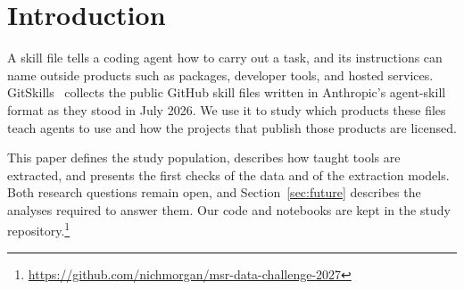 \section{Introduction}

A skill file tells a coding agent how to carry out a task, and its instructions can name outside products such as packages, developer tools, and hosted services.
GitSkills~\cite{gitskills2027} collects the public GitHub skill files written in Anthropic's agent-skill format as they stood in July 2026.
We use it to study which products these files teach agents to use and how the projects that publish those products are licensed.

This paper defines the study population, describes how taught tools are extracted, and presents the first checks of the data and of the extraction models.
Both research questions remain open, and Section~\ref{sec:future} describes the analyses required to answer them.
Our code and notebooks are kept in the study repository.\footnote{\url{https://github.com/nichmorgan/msr-data-challenge-2027}}

